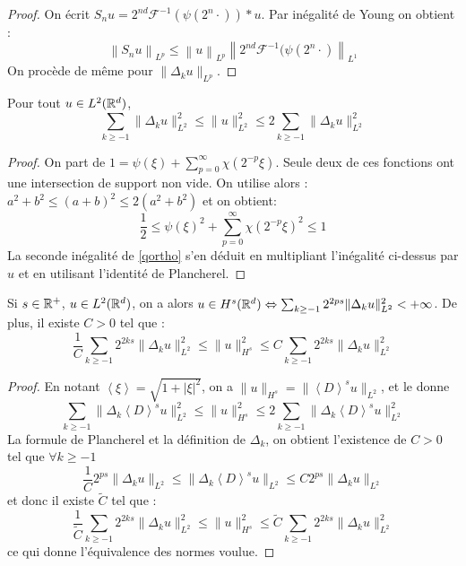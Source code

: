 \documentclass[11pt,a4paper]{article}
\begin{document}
\begin{proof}
On écrit $S_n u = 2^{nd} \mathcal{F}^{-1}(\psi(2^n\cdot))\ast u$. Par inégalité de Young on obtient :
$$\left\lVert S_n u \right\rVert_{L^p} \leq \left\lVert u \right\rVert_{L^p} \left\lVert 2^{nd} \mathcal{F}^{-1}(\psi(2^n\cdot)  \right\rVert_{L^1}$$ 
On procède de même pour $\|\Delta_k u\|_{L^p}$.
\end{proof}

\begin{lemma}\label{lqortho}
Pour tout $u\in L^2(\mathbb R^d)$, 
\begin{equation}\label{qortho}
\sum_{k \geq -1} \|\Delta_k u \|^2_{L^2} \leq \| u \|^2_{L^2} \leq 2 \sum_{k \geq -1} \|\Delta_k u \|^2_{L^2} 
\end{equation}
\end{lemma}

\begin{proof}
On part de $1= \psi(\xi) + \sum_{p=0}^\infty \chi(2^{-p} \xi)$.
Seule deux de ces fonctions ont une intersection de support non vide. On utilise alors : $a^2 +b^2 \leq (a+b)^2 \leq 2(a^2 +b^2)$ et on obtient:
$$ \frac{1}{2} \leq \psi(\xi)^2 + \sum_{p=0}^\infty \chi(2^{-p} \xi)^2 \leq 1$$
La seconde inégalité de \eqref{qortho} s'en déduit en multipliant l'inégalité ci-dessus par $\hat{u}$ et en utilisant l'identité de Plancherel.
\end{proof}

\begin{prop}\label{prop_carac_sobolev}
Si $s\in \mathbb R^+$, $u\in L^2(\mathbb R^d)$, on a alors $u\in H^s(\mathbb R^d) \Leftrightarrow \sum_{k\geq -1}2^{2ps}\|\Delta_k u \|_{L^2}^2 < +\infty$. De plus, il existe $C>0$ tel que :
\begin{equation}\label{carac_sobol}
\frac{1}{C}\sum_{k\geq -1}2^{2ks}\|\Delta_k u \|_{L^2}^2 \leq \|u\|_{H^s}^2 \leq C \sum_{k\geq -1}2^{2ks}\|\Delta_k u \|_{L^2}^2 
\end{equation}
\end{prop}

\begin{proof}
En notant $\left\langle \xi \right\rangle = \sqrt{1 + |\xi|^2}$, on a $\|u\|_{H^s} = \|\left\langle D \right\rangle^su\|_{L^2}$, et le  donne 
\[\sum_{k \geq -1} \|\Delta_k \left\langle D \right\rangle^su \|^2_{L^2} \leq \| u \|^2_{H^s} \leq 2 \sum_{k \geq -1} \|\Delta_k \left\langle D \right\rangle^su \|^2_{L^2} \]
La formule de Plancherel et la définition de $\Delta_k$, on obtient l'existence de $C>0$ tel que $\forall k \geq -1$
\[\frac{1}{C}2^{ps}\|\Delta_ku\|_{L^2} \leq  \|\Delta_k\left\langle D \right\rangle^su\|_{L^2} \leq C2^{ps}\|\Delta_ku\|_{L^2} \]
et donc il existe $\tilde{C}$ tel que :
\[
\frac{1}{\tilde{C}}\sum_{k\geq -1}2^{2ks}\|\Delta_k u \|_{L^2}^2 \leq \|u\|_{H^s}^2 \leq \tilde{C} \sum_{k\geq -1}2^{2ks}\|\Delta_k u \|_{L^2}^2 \]
ce qui donne l'équivalence des normes voulue.
\end{proof}
\end{document}
